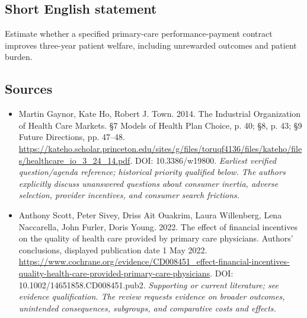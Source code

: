 \documentclass[11pt]{article}
\begin{document}
\subsection{Short English statement}
Estimate whether a specified primary-care performance-payment contract improves three-year patient welfare, including unrewarded outcomes and patient burden.

\subsection{Sources}
\begin{itemize}\raggedright
\item[\textnormal{[S1]}]\hypertarget{source:30007725:1}{} Martin Gaynor, Kate Ho, Robert J. Town. 2014. The Industrial Organization of Health Care Markets. §7 Models of Health Plan Choice, p. 40; §8, p. 43; §9 Future Directions, pp. 47–48.
\url{https://kateho.scholar.princeton.edu/sites/g/files/toruqf4136/files/kateho/files/healthcare_io_3_24_14.pdf}.
DOI: 10.3386/w19800.
{\small\textit{Earliest verified question/agenda reference; historical priority qualified below. The authors explicitly discuss unanswered questions about consumer inertia, adverse selection, provider incentives, and consumer search frictions.}}

\item[\textnormal{[S2]}]\hypertarget{source:30007725:2}{} Anthony Scott, Peter Sivey, Driss Ait Ouakrim, Laura Willenberg, Lena Naccarella, John Furler, Doris Young. 2022. The effect of financial incentives on the quality of health care provided by primary care physicians. Authors’ conclusions, displayed publication date 1 May 2022.
\url{https://www.cochrane.org/evidence/CD008451_effect-financial-incentives-quality-health-care-provided-primary-care-physicians}.
DOI: 10.1002/14651858.CD008451.pub2.
{\small\textit{Supporting or current literature; see evidence qualification. The review requests evidence on broader outcomes, unintended consequences, subgroups, and comparative costs and effects.}}
\end{itemize}
\end{document}

